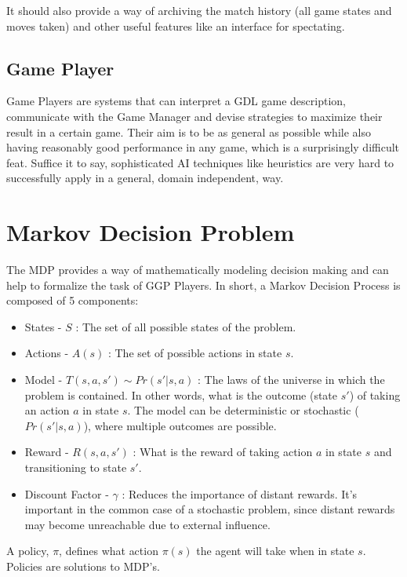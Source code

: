 It should also provide a way of archiving the match history (all game states and moves taken) and other useful features like an interface for spectating.

\subsection{Game Player}
Game Players are systems that can interpret a \gls{GDL} game description, communicate with the Game Manager and devise strategies to maximize their result in a certain game.
Their aim is to be as general as possible while also having reasonably good performance in any game, which is a surprisingly difficult feat. Suffice it to say, sophisticated AI techniques like heuristics are very hard to successfully apply in a general, domain independent, way. 

\section{Markov Decision Problem}
The \gls{MDP} provides a way of mathematically modeling decision making and can help to formalize the task of GGP Players.
In short, a Markov Decision Process is composed of 5 components:

\begin{itemize}
\item States - $S$ : The set of all possible states of the problem. 

\item Actions - $A(s)$ : The set of possible actions in state $s$.

\item Model - $T(s, a, s') \sim Pr(s' | s, a)$ : The laws of the universe in which the problem is contained. In other words, what is the outcome (state $s'$) of taking an action $a$ in state $s$. The model can be deterministic or stochastic ($Pr(s' | s, a)$), where multiple outcomes are possible.

\item Reward - $R(s, a, s')$ : What is the reward of taking action $a$ in state $s$ and transitioning to state $s'$. 

\item Discount Factor - $\gamma$ : Reduces the importance of distant rewards. It's important in the common case of a stochastic problem, since distant rewards may become unreachable due to external influence.
\end{itemize}

A policy, $\pi$, defines what action $\pi(s)$ the agent will take when in state $s$. Policies are solutions to \gls{MDP}'s. 


